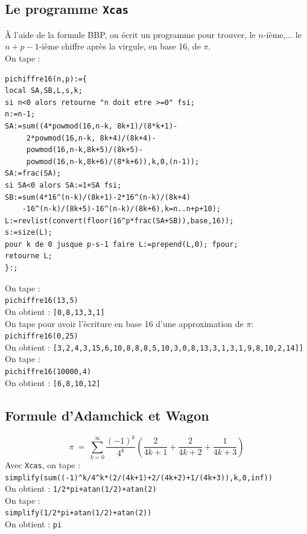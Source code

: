 \documentclass[a4paper,11pt]{book}
\begin{document}
\subsection{Le programme {\tt Xcas}}
\`A l'aide de la formule BBP, on \'ecrit un programme pour trouver, le
$n$-ième,... le $n+p-1$-ième chiffre apr\`es la virgule, en base 16, de $\pi$.\\
On tape :
\begin{verbatim}
pichiffre16(n,p):={
local SA,SB,L,s,k;
si n<0 alors retourne "n doit etre >=0" fsi;
n:=n-1;
SA:=sum((4*powmod(16,n-k, 8k+1)/(8*k+1)-
     2*powmod(16,n-k, 8k+4)/(8k+4)-
     powmod(16,n-k,8k+5)/(8k+5)-
     powmod(16,n-k,8k+6)/(8*k+6)),k,0,(n-1));
SA:=frac(SA);
si SA<0 alors SA:=1+SA fsi;
SB:=sum(4*16^(n-k)/(8k+1)-2*16^(n-k)/(8k+4)
    -16^(n-k)/(8k+5)-16^(n-k)/(8k+6),k=n..n+p+10);
L:=revlist(convert(floor(16^p*frac(SA+SB)),base,16));
s:=size(L);
pour k de 0 jusque p-s-1 faire L:=prepend(L,0); fpour;
retourne L;
}:;
\end{verbatim}
On tape :\\
{\tt pichiffre16(13,5) }\\
On obtient : {\tt [0,8,13,3,1]}\\
On tape pour avoir l'\`ecriture en base 16 d'une approximation de $\pi$:\\
{\tt pichiffre16(0,25) }\\
On obtient : {\tt [3,2,4,3,15,6,10,8,8,8,5,10,3,0,8,13,3,1,3,1,9,8,10,2,14]]}
On tape :\\
{\tt pichiffre16(10000,4) }\\
On obtient : {\tt [6,8,10,12]}

\subsection{Formule d'Adamchick et Wagon}
$$\pi\ =\ \sum_{k=0}^\infty \frac{(-1)^k}{4^{k}}\left(\frac{2}{4k+1}+\frac{2}{4k+2}+\frac{1}{4k+3}\right)$$
Avec {\tt Xcas}, on tape :\\
{\tt simplify(sum((-1)\verb|^|k/4\verb|^|k*(2/(4k+1)+2/(4k+2)+1/(4k+3)),k,0,inf))}\\
On obtient : {\tt 1/2*pi+atan(1/2)+atan(2)}\\
On tape :\\
{\tt simplify(1/2*pi+atan(1/2)+atan(2))}\\
On obtient : {\tt pi}
\end{document}
